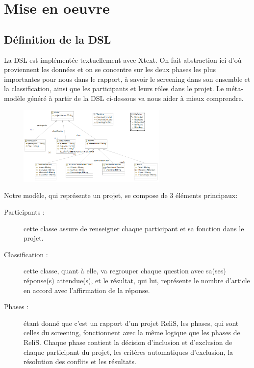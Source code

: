 \newpage

\section{Mise en oeuvre}

\vspace*{3mm}

\subsection{Définition de la DSL}
La DSL est implémentée textuellement avec Xtext. On fait abstraction ici d'où proviennent les données et on se concentre sur les deux phases les plus importantes pour nous dans le rapport, à savoir le screening dans son ensemble et la classification, ainsi que les participants et leurs rôles dans le projet. Le méta-modèle généré à partir de la DSL ci-dessous va nous aider à mieux comprendre.

\begin{figure}[H]
        \centering
        \includegraphics[width=0.65\textwidth]{resources/images/DSL.PNG}
\end{figure}

Notre modèle, qui représente un projet, se compose de 3 éléments principaux:
\begin{description}
    \item[Participants :] cette classe assure de renseigner chaque participant et sa fonction dans le projet.
    \item[Classification :] cette classe, quant à elle, va regrouper chaque question avec sa(ses) réponse(s) attendue(s), et le résultat, qui lui, représente le nombre d'article en accord avec l'affirmation de la réponse.
    \item[Phases :] étant donné que c'est un rapport d'un projet ReliS, les phases, qui sont celles du screening, fonctionnent avec la même logique que les phases de ReliS. Chaque phase contient la décision d'inclusion et d'exclusion de chaque participant du projet, les critères automatiques d'exclusion, la résolution des conflits et les résultats. 
\end{description}

